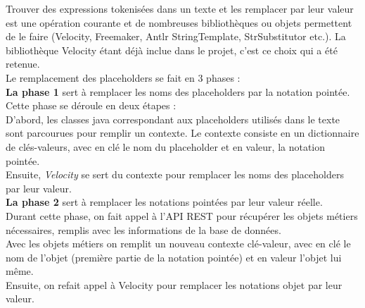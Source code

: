 Trouver des expressions tokenisées dans un texte et les remplacer par leur valeur est une opération courante et de nombreuses bibliothèques ou objets permettent de le faire (Velocity, Freemaker, Antlr StringTemplate, StrSubstitutor etc.).
La bibliothèque Velocity étant déjà inclue dans le projet, c'est ce choix qui a été retenue.\\

Le remplacement des placeholders se fait en 3 phases : \\

\textbf{La phase 1} sert à remplacer les noms des placeholders par la notation pointée.\\
Cette phase se déroule en deux étapes : \\
D'abord, les classes java correspondant aux placeholders utilisés dans le texte sont parcourues pour remplir un contexte. Le contexte consiste en un dictionnaire de clés-valeurs, avec en clé le nom du placeholder et en valeur, la notation pointée.\\
Ensuite, \textit{Velocity} se sert du contexte pour remplacer les noms des placeholders par leur valeur.\\

\textbf{La phase 2} sert à remplacer les notations pointées par leur valeur réelle.\\
Durant cette phase, on fait appel à l'API REST pour récupérer les objets métiers nécessaires, remplis avec les informations de la base de données.\\
Avec les objets métiers on remplit un nouveau contexte clé-valeur, avec en clé le nom de l'objet (première partie de la notation pointée) et en valeur l'objet lui même.\\
Ensuite, on refait appel à Velocity pour remplacer les notations objet par leur valeur.\\

